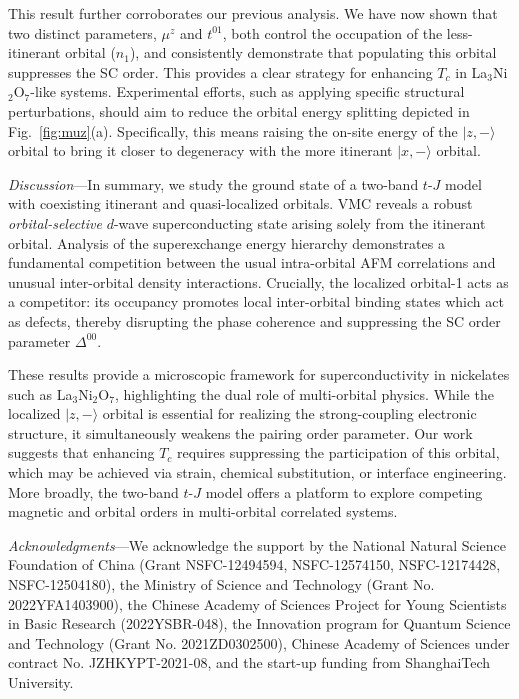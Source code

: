 \documentclass[reprint,superscriptaddress,amsmath,amssymb,aps,twocolumn]{revtex4-1}
\begin{document}
This result further corroborates our previous analysis. We have now shown that two distinct parameters, $\mu^z$ and $t^{01}$, both control the occupation of the less-itinerant orbital ($n_1$), and consistently demonstrate that populating this orbital suppresses the SC order. This provides a clear strategy for enhancing $T_c$ in La$_3$Ni$_2$O$_7$-like systems. Experimental efforts, such as applying specific structural perturbations, should aim to reduce the orbital energy splitting depicted in Fig.~\ref{fig:muz}(a). Specifically, this means raising the on-site energy of the $|z,-\rangle$ orbital to bring it closer to degeneracy with the more itinerant $|x,-\rangle$ orbital.


{\color{blue}\em Discussion}---In summary, we study the ground state of a two-band $t$-$J$ model with coexisting itinerant and quasi-localized orbitals. VMC reveals a robust {\em orbital-selective} $d$-wave superconducting state arising solely from the itinerant orbital. Analysis of the superexchange energy hierarchy demonstrates a fundamental competition between the usual intra-orbital AFM correlations and unusual inter-orbital density interactions. Crucially, the localized orbital-1 acts as a competitor: its occupancy promotes local inter-orbital binding states which act as defects, thereby disrupting the phase coherence and suppressing the SC order parameter $\Delta^{00}$.

These results provide a microscopic framework for superconductivity in nickelates such as La$_3$Ni$_2$O$_7$, highlighting the dual role of multi-orbital physics. While the localized $|z,-\rangle$ orbital is essential for realizing the strong-coupling electronic structure, it simultaneously weakens the pairing order parameter. Our work suggests that enhancing $T_c$ requires suppressing the participation of this orbital, which may be achieved via strain, chemical substitution, or interface engineering. More broadly, the two-band $t$-$J$ model offers a platform to explore competing magnetic and orbital orders in multi-orbital correlated systems.



{\em Acknowledgments}---We acknowledge the support by the National Natural Science Foundation of China (Grant NSFC-12494594, NSFC-12574150, NSFC-12174428, NSFC-12504180), the Ministry of Science and Technology (Grant No. 2022YFA1403900), the Chinese Academy of Sciences Project for Young Scientists in Basic Research (2022YSBR-048), the Innovation program for Quantum Science and Technology (Grant No. 2021ZD0302500), Chinese Academy of Sciences under contract No. JZHKYPT-2021-08, and the start-up funding from ShanghaiTech University.
\end{document}
